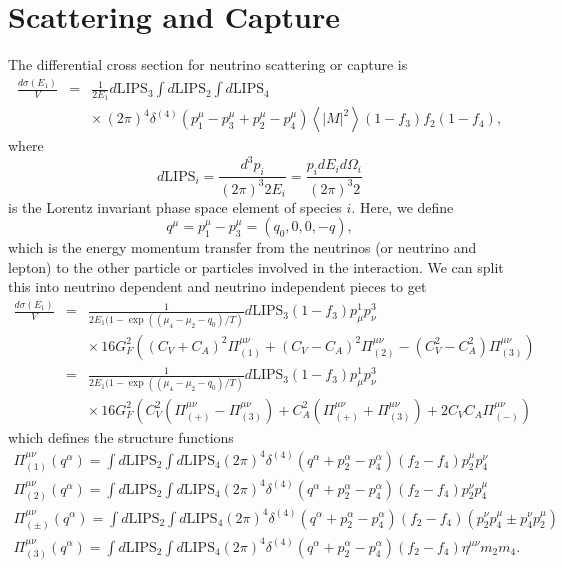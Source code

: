 \documentclass[12pt,letter]{article}
\begin{document}
\section{Scattering and Capture} 
The differential cross section for neutrino scattering or capture is 
\begin{eqnarray*}
\frac{d \sigma(E_1)}{V} &=& \frac{1}{2 E_1} d\textrm{LIPS}_3 \int d\textrm{LIPS}_2 
\int d\textrm{LIPS}_4 \\
&& \times \, (2 \pi)^4 \delta^{(4)}\left(p^\mu_1 - p^\mu_3 + p^\mu_2 - p^\mu_4 \right)
\left\langle \left| M \right|^2 \right \rangle (1-f_3) f_2 (1-f_4),
\end{eqnarray*}
where 
\begin{equation*}
d\textrm{LIPS}_i = \frac{d^3p_i}{(2\pi)^3 2 E_i} 
= \frac{p_i dE_i d \Omega_i}{(2\pi)^3 2} 
\end{equation*}
is the Lorentz invariant phase space element of species $i$.  Here, we define 
\begin{equation}
q^\mu = p_1^\mu - p_3^\mu=(q_0,0,0,-q),
\end{equation}
which is the energy momentum transfer from the neutrinos (or neutrino and lepton) to the other particle or particles involved in the interaction.  We can split this into neutrino dependent and neutrino independent pieces to get 
\begin{eqnarray*}
\frac{d \sigma(E_1)}{V} &=& \frac{1}{2 E_1(1- \exp((\mu_4 - \mu_2 - q_0)/T)}  d\textrm{LIPS}_3 (1-f_3) 
p^1_\mu p^3_\nu \\
&&\times \, 16 G_F^2\left( 
 (C_V+C_A)^2 \Pi_{(1)}^{\mu \nu}
+(C_V-C_A)^2 \Pi_{(2)}^{\mu \nu}
-(C_V^2-C_A^2) \Pi_{(3)}^{\mu \nu} \right) \\
&=& \frac{1}{2 E_1(1- \exp((\mu_4 - \mu_2 - q_0)/T)}  d\textrm{LIPS}_3 (1-f_3) 
p^1_\mu p^3_\nu \\
&&\times \, 16 G_F^2\left( 
  C_V^2 \left(\Pi_{(+)}^{\mu \nu} - \Pi_{(3)}^{\mu \nu} \right) 
+ C_A^2 \left(\Pi_{(+)}^{\mu \nu} + \Pi_{(3)}^{\mu \nu} \right) 
+ 2 C_V C_A \Pi_{(-)}^{\mu \nu}
 \right)
\end{eqnarray*}
which defines the structure functions 
\begin{eqnarray*}
\Pi_{(1)}^{\mu \nu}(q^\alpha) = \int d\textrm{LIPS}_2 \int d\textrm{LIPS}_4
(2 \pi)^4 \delta^{(4)}\left(q^\alpha + p^\alpha_2 - p^\alpha_4 \right) 
(f_2-f_4)p^\mu_2 p^\nu_4 \nonumber\\
\Pi_{(2)}^{\mu \nu}(q^\alpha) = \int d\textrm{LIPS}_2 \int d\textrm{LIPS}_4
(2 \pi)^4 \delta^{(4)}\left(q^\alpha + p^\alpha_2 - p^\alpha_4 \right) 
(f_2-f_4) p^\nu_2 p^\mu_4 \nonumber\\
\Pi_{(\pm)}^{\mu \nu}(q^\alpha) = \int d\textrm{LIPS}_2 \int d\textrm{LIPS}_4
(2 \pi)^4 \delta^{(4)}\left(q^\alpha + p^\alpha_2 - p^\alpha_4 \right) 
(f_2-f_4)(p^\nu_2 p^\mu_4 \pm p^\nu_4 p^\mu_2) \nonumber\\
\Pi_{(3)}^{\mu \nu}(q^\alpha) = \int d\textrm{LIPS}_2 \int d\textrm{LIPS}_4
(2 \pi)^4 \delta^{(4)}\left(q^\alpha + p^\alpha_2 - p^\alpha_4 \right) 
(f_2-f_4) \eta^{\mu \nu} m_2 m_4.
\end{eqnarray*} 
\end{document}
